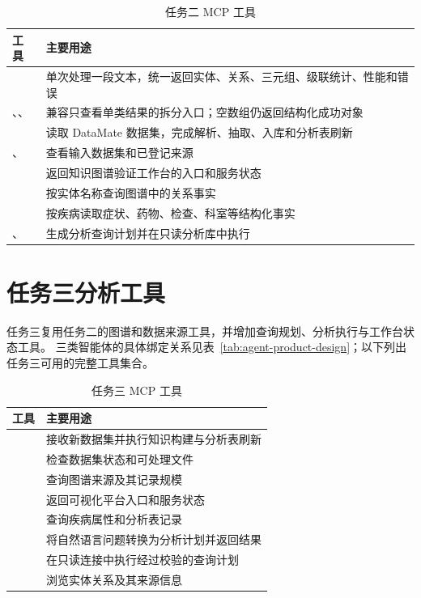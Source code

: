 \clearpage
\begin{table}[H]
\centering
\small
\setlength{\tabcolsep}{4pt}
\caption{任务二 MCP 工具}
\label{tab:assets-task2-tools}
\begin{tabularx}{\textwidth}{L{4.5cm}Y}
\toprule
\textbf{工具} & \textbf{主要用途} \\
\midrule
{} & 单次处理一段文本，统一返回实体、关系、三元组、级联统计、性能和错误 \\
、、 & 兼容只查看单类结果的拆分入口；空数组仍返回结构化成功对象 \\
 & 读取 DataMate 数据集，完成解析、抽取、入库和分析表刷新 \\
、 & 查看输入数据集和已登记来源 \\
 & 返回知识图谱验证工作台的入口和服务状态 \\
 & 按实体名称查询图谱中的关系事实 \\
 & 按疾病读取症状、药物、检查、科室等结构化事实 \\
、 & 生成分析查询计划并在只读分析库中执行 \\
\bottomrule
\end{tabularx}
\end{table}

\section{任务三分析工具}

任务三复用任务二的图谱和数据来源工具，并增加查询规划、分析执行与工作台状态工具。
三类智能体的具体绑定关系见表~\ref{tab:agent-product-design}；以下列出任务三可用的完整工具集合。

\begin{table}[H]
\centering
\small
\setlength{\tabcolsep}{4pt}
\caption{任务三 MCP 工具}
\label{tab:assets-task3-tools}
\begin{tabularx}{\textwidth}{L{4.5cm}Y}
\toprule
\textbf{工具} & \textbf{主要用途} \\
\midrule
{} & 接收新数据集并执行知识构建与分析表刷新 \\
 & 检查数据集状态和可处理文件 \\
 & 查询图谱来源及其记录规模 \\
 & 返回可视化平台入口和服务状态 \\
 & 查询疾病属性和分析表记录 \\
 & 将自然语言问题转换为分析计划并返回结果 \\
 & 在只读连接中执行经过校验的查询计划 \\
 & 浏览实体关系及其来源信息 \\
\bottomrule
\end{tabularx}
\end{table}

